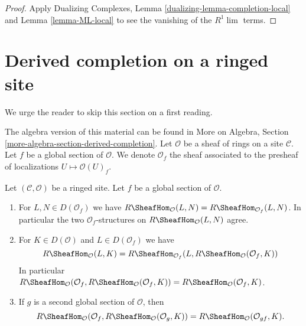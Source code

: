 \begin{proof}
Apply Dualizing Complexes, Lemma \ref{dualizing-lemma-completion-local}
and Lemma \ref{lemma-ML-local} to see the vanishing of the $R^1\lim$ terms.
\end{proof}








\section{Derived completion on a ringed site}
\label{section-derived-completion}

\noindent
We urge the reader to skip this section on a first reading.

\medskip\noindent
The algebra version of this material can be found in
More on Algebra, Section \ref{more-algebra-section-derived-completion}.
Let $\mathcal{O}$ be a sheaf of rings on a site $\mathcal{C}$.
Let $f$ be a global section of $\mathcal{O}$. We denote
$\mathcal{O}_f$ the sheaf associated to the presheaf of localizations
$U \mapsto \mathcal{O}(U)_f$.

\begin{lemma}
\label{lemma-map-twice-localize}
Let $(\mathcal{C}, \mathcal{O})$ be a ringed site. Let $f$ be a global
section of $\mathcal{O}$.
\begin{enumerate}
\item For $L, N \in D(\mathcal{O}_f)$ we have
$R\SheafHom_\mathcal{O}(L, N) = R\SheafHom_{\mathcal{O}_f}(L, N)$.
In particular the two $\mathcal{O}_f$-structures on
$R\SheafHom_\mathcal{O}(L, N)$ agree.
\item For $K \in D(\mathcal{O})$ and
$L \in D(\mathcal{O}_f)$ we have
$$
R\SheafHom_\mathcal{O}(L, K) =
R\SheafHom_{\mathcal{O}_f}(L, R\SheafHom_\mathcal{O}(\mathcal{O}_f, K))
$$
In particular
$R\SheafHom_\mathcal{O}(\mathcal{O}_f,
R\SheafHom_\mathcal{O}(\mathcal{O}_f, K)) =
R\SheafHom_\mathcal{O}(\mathcal{O}_f, K)$.
\item If $g$ is a second global
section of $\mathcal{O}$, then
$$
R\SheafHom_\mathcal{O}(\mathcal{O}_f, R\SheafHom_\mathcal{O}(\mathcal{O}_g, K))
= R\SheafHom_\mathcal{O}(\mathcal{O}_{gf}, K).
$$
\end{enumerate}
\end{lemma}

